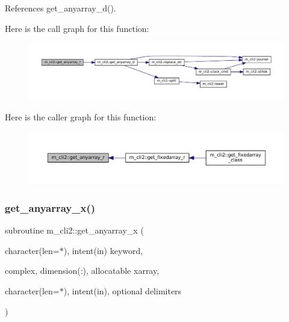 References get\+\_\+anyarray\+\_\+d().

Here is the call graph for this function\+:\nopagebreak
\begin{figure}[H]
\begin{center}
\leavevmode
\includegraphics[width=350pt]{namespacem__cli2_a8f1d5223b075f23d513c94548a1ebf09_cgraph}
\end{center}
\end{figure}
Here is the caller graph for this function\+:\nopagebreak
\begin{figure}[H]
\begin{center}
\leavevmode
\includegraphics[width=350pt]{namespacem__cli2_a8f1d5223b075f23d513c94548a1ebf09_icgraph}
\end{center}
\end{figure}
\mbox{\label{namespacem__cli2_ab9ab288fa5f108beeb7c94d81b223b7c}} 
\subsubsection{\texorpdfstring{get\+\_\+anyarray\+\_\+x()}{get\_anyarray\_x()}}
{\footnotesize\ttfamily subroutine m\+\_\+cli2\+::get\+\_\+anyarray\+\_\+x (\begin{DoxyParamCaption}\item[{character(len=$\ast$), intent(in)}]{keyword,  }\item[{complex, dimension(\+:), allocatable}]{xarray,  }\item[{character(len=$\ast$), intent(in), optional}]{delimiters }\end{DoxyParamCaption})\hspace{0.3cm}{\ttfamily [private]}}



